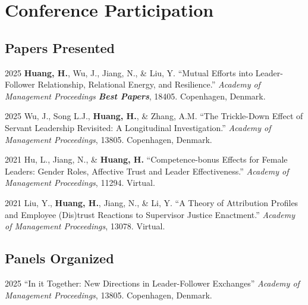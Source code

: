 \documentclass[12pt,letterpaper]{report} %
\begin{document}

    \section*{Conference Participation}

    \subsection*{Papers Presented}
    
    \begin{tablist}

        \item[2025]\tab{}\textbf{Huang, H.}, Wu, J., Jiang, N., \& Liu, Y. \enquote{Mutual Efforts into Leader-Follower Relationship, Relational Energy, and Resilience.} \textit{Academy of Management Proceedings \textbf{Best Papers}}, 18405. Copenhagen, Denmark.
        
        \item[2025]\tab{}Wu, J., Song L.J., \textbf{Huang, H.}, \& Zhang, A.M. \enquote{The Trickle-Down Effect of Servant Leadership Revisited: A Longitudinal Investigation.} \textit{Academy of Management Proceedings}, 13805. Copenhagen, Denmark.
        
        \item[2021]\tab{}Hu, L., Jiang, N., \& \textbf{Huang, H.} \enquote{Competence-bonus Effects for Female Leaders: Gender Roles, Affective Trust and Leader Effectiveness.} \textit{Academy of Management Proceedings}, 11294. Virtual.
        
        \item[2021]\tab{}Liu, Y., \textbf{Huang, H.}, Jiang, N., \& Li, Y. \enquote{A Theory of Attribution Profiles and Employee (Dis)trust Reactions to Supervisor Justice Enactment.} \textit{Academy of Management Proceedings}, 13078. Virtual.

    \end{tablist}

    \subsection*{Panels Organized}
    
    \begin{tablist}

        \item[2025]\tab{}\enquote{In it Together: New Directions in Leader-Follower Exchanges} \textit{Academy of Management Proceedings}, 13805. Copenhagen, Denmark.
        
    \end{tablist}
\end{document}
